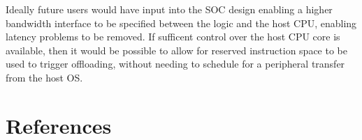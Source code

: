 \documentclass[a4paper]{article}
\begin{document}
Ideally future users would have input into the SOC design enabling a higher bandwidth interface to be specified between the logic and the host CPU, enabling latency problems to be removed. If sufficent control over the host CPU core is available, then it would be possible to allow for reserved instruction space to be used to trigger offloading, without needing to schedule for a peripheral transfer from the host OS.

\section{References}


\end{document}
